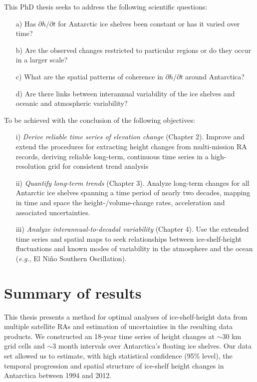 This PhD thesis seeks to address the following scientific questions:

\begin{enumerate}
  \item[a)] Has $\partial h / \partial t$ for Antarctic ice shelves been constant
  or has it varied over time?
  \item[b)] Are the observed changes restricted to particular regions or do they
  occur in a larger scale?
  \item[c)] What are the spatial patterns of coherence in $\partial h / \partial t$
  around Antarctica?
  \item[d)] Are there links between interannual variability of the ice shelves and
  oceanic and atmospheric variability?
\end{enumerate}

To be achieved with the conclusion of the following objectives:

\begin{enumerate}
  \item[i)] {\it Derive reliable time series of elevation change} ({\sc Chapter 2}). Improve and
  extend the procedures for extracting height changes from multi-mission RA
  records, deriving reliable long-term, continuous time series in a
  high-resolution grid for consistent trend analysis
  \item[ii)] {\it Quantify long-term trends} ({\sc Chapter 3}). Analyze long-term changes for
  all Antarctic ice shelves spanning a time period of nearly two decades,
  mapping in time and space the height-/volume-change rates, acceleration
  and associated uncertainties.
  \item[iii)] {\it Analyze interannual-to-decadal variability} ({\sc Chapter 4}). Use the
  extended time series and spatial maps to seek relationships between
  ice-shelf-height fluctuations and known modes of variability in the
  atmosphere and the ocean ({\it e.g.}, El Ni\~{n}o Southern Oscillation).
\end{enumerate}




\section*{Summary of results}

This thesis presents a method for optimal analyses of ice-shelf-height data from multiple satellite RAs and estimation of uncertainties in the resulting data products. We constructed an 18-year time series of height changes at $\sim$30 km grid cells and $\sim$3 month intervals over Antarctica's floating ice shelves. Our data set allowed us to estimate, with high statistical confidence (95\% level), the temporal progression and spatial structure of ice-shelf height changes in Antarctica between 1994 and 2012.

